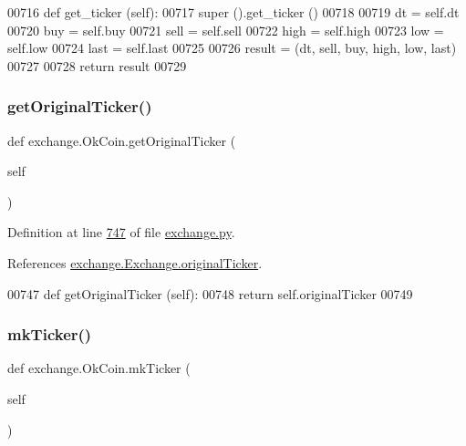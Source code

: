 \begin{DoxyCode}
00716     \textcolor{keyword}{def }get\_ticker (self):
00717         super ().get\_ticker ()
00718         
00719         dt   = self.dt
00720         buy  = self.buy
00721         sell = self.sell
00722         high = self.high
00723         low  = self.low
00724         last = self.last
00725         
00726         result = (dt, sell, buy, high, low, last)
00727         
00728         \textcolor{keywordflow}{return} result
00729     
\end{DoxyCode}
\mbox{\label{classexchange_1_1_ok_coin_aa3fa76e1280f612c3d0f7903d8847684}} 
\subsubsection{\texorpdfstring{get\+Original\+Ticker()}{getOriginalTicker()}}
{\footnotesize\ttfamily def exchange.\+Ok\+Coin.\+get\+Original\+Ticker (\begin{DoxyParamCaption}\item[{}]{self }\end{DoxyParamCaption})}



Definition at line \hyperlink{exchange_8py_source_l00747}{747} of file \hyperlink{exchange_8py_source}{exchange.\+py}.



References \hyperlink{exchange_8py_source_l00186}{exchange.\+Exchange.\+original\+Ticker}.


\begin{DoxyCode}
00747     \textcolor{keyword}{def }getOriginalTicker (self):
00748         \textcolor{keywordflow}{return} self.originalTicker
00749     
\end{DoxyCode}
\mbox{\label{classexchange_1_1_ok_coin_a7d835eb9a0e9603c5b540035c9caaa6a}} 
\subsubsection{\texorpdfstring{mk\+Ticker()}{mkTicker()}}
{\footnotesize\ttfamily def exchange.\+Ok\+Coin.\+mk\+Ticker (\begin{DoxyParamCaption}\item[{}]{self }\end{DoxyParamCaption})}




